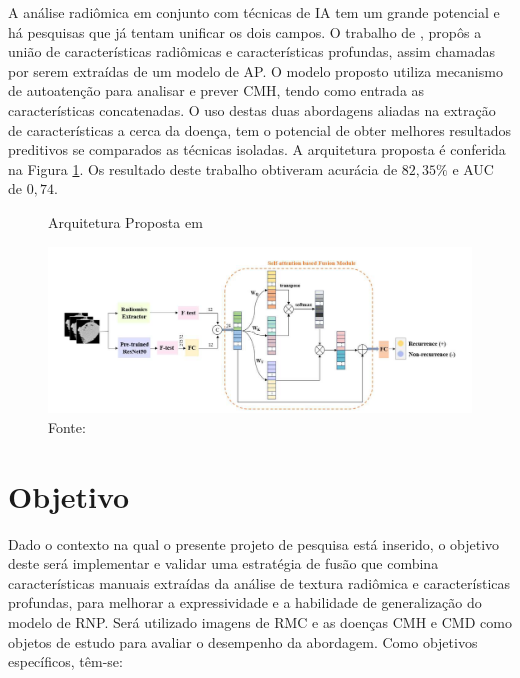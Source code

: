 A análise radiômica em conjunto com técnicas de \gls{IA} tem um grande potencial e há pesquisas que já tentam unificar os dois campos. O trabalho de , propôs a união de características radiômicas e características profundas, assim chamadas por serem extraídas de um modelo de \gls{AP}. O modelo proposto utiliza mecanismo de autoatenção para analisar e prever \gls{CMH}, tendo como entrada as características concatenadas. O uso destas duas abordagens aliadas na extração de características a cerca da doença, tem o potencial de obter melhores resultados preditivos se comparados as técnicas isoladas. A arquitetura proposta é conferida na Figura \ref{fig:fig006}. Os resultado deste trabalho obtiveram acurácia de $82,35\%$ e AUC de $0,74$.

\begin{figure}[t!]
    \centering
    \captionsetup{justification=centering}
    \caption{Arquitetura Proposta em }
    \includegraphics[width=1\textwidth]{figures/fig006.png}
    \caption*{Fonte: \cite{aiSelfAttentionBasedFusion2023}}
    \label{fig:fig006}
\end{figure}

\clearpage

\section{Objetivo}
\label{sec:cap1_objetivo}

Dado o contexto na qual o presente projeto de pesquisa está inserido, o objetivo deste será implementar e validar uma estratégia de fusão que combina características manuais extraídas da análise de textura radiômica e características profundas, para melhorar a expressividade e a habilidade de generalização do modelo de \gls{RNP}. Será utilizado imagens de \gls{RMC} e as doenças \gls{CMH} e \gls{CMD} como objetos de estudo para avaliar o desempenho da abordagem. Como objetivos específicos, têm-se:

